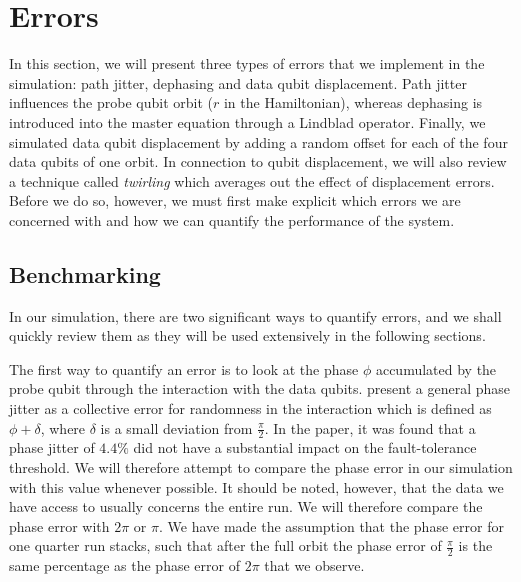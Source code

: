 \section{Errors} \label{sec:errors}
In this section, we will present three types of errors that we implement in the simulation: path jitter, dephasing and data qubit displacement. Path jitter influences the probe qubit orbit ($r$ in the Hamiltonian), whereas dephasing is introduced into the master equation through a Lindblad operator. Finally, we simulated data qubit displacement by adding a random offset for each of the four data qubits of one orbit. In connection to qubit displacement, we will also review a technique called \emph{twirling} which averages out the effect of displacement errors. Before we do so, however, we must first make explicit which errors we are concerned with and how we can quantify the performance of the system. 


\subsection{Benchmarking}
In our simulation, there are two significant ways to quantify errors, and we shall quickly review them as they will be used extensively in the following sections.

The first way to quantify an error is to look at the phase $\phi$ accumulated by the probe qubit through the interaction with the data qubits. \citet{OGorman2016} present a general phase jitter as a collective error for randomness in the interaction which is defined as $\phi + \delta$, where $\delta$ is a small deviation from $\frac{\pi}{2}$.  In the paper, it was found that a phase jitter of $4.4 \%$ did not have a substantial impact on the fault-tolerance threshold. We will therefore attempt to compare the phase error in our simulation with this value whenever possible. It should be noted, however, that the data we have access to usually concerns the entire run. We will therefore compare the phase error with $2\pi$ or $\pi$. We have made the assumption that the phase error for one quarter run stacks, such that after the full orbit the phase error of $\frac{\pi}{2}$ is the same percentage as the phase error of $2\pi$ that we observe. 

